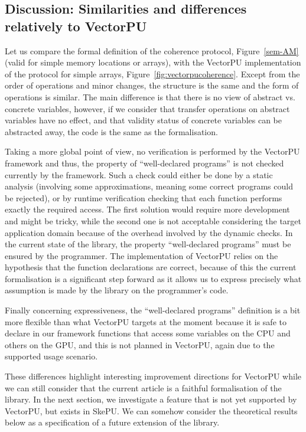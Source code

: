 \documentclass[preprint,12pt]{elsarticle}
\begin{document}
\subsection{Discussion: Similarities and differences relatively to VectorPU}



Let us compare the formal definition of the coherence protocol, Figure~\ref{sem-AM} (valid for simple memory locations or arrays), with the VectorPU implementation of the protocol for simple arrays, Figure~\ref{fig:vectorpucoherence}. Except from the order of operations and minor changes, the structure is the same and the form of operations is similar. The main difference is that there is no view of abstract vs. concrete variables, however, if we consider that transfer operations on abstract variables have no effect, and that validity status of concrete variables can be abstracted away, the code is  the same as the formalisation. 

Taking a more global point of view, no verification is performed by the VectorPU framework and thus, the property of ``well-declared programs'' is not checked currently by the framework. Such a check could either be done by a static analysis (involving some approximations, meaning  some correct programs could be rejected), or by runtime verification checking that each function performs exactly the required access. The first solution would require more development and might be tricky, while the second one is not acceptable considering the target application domain because of the overhead involved by the dynamic checks. In the current state of the library, the property ``well-declared programs''  must be ensured by the programmer. The implementation of VectorPU relies on the hypothesis that the function declarations are correct, because of this the current formalisation is a significant step forward as it allows us to express precisely what assumption is made by the library on the programmer's code.

Finally concerning expressiveness, the ``well-declared programs'' definition is a bit more flexible than what VectorPU targets at the moment because it is safe to declare in our framework functions that access some variables on the CPU and others on the GPU, and this is not planned in VectorPU, again due to the supported usage scenario.

These differences highlight interesting improvement directions for VectorPU while we can still consider that the current article  is a faithful formalisation of the library. In the next section, we investigate a feature that is not yet supported by VectorPU, but exists in SkePU. We can somehow consider the theoretical results below as a specification of a future extension of the library.
\end{document}
